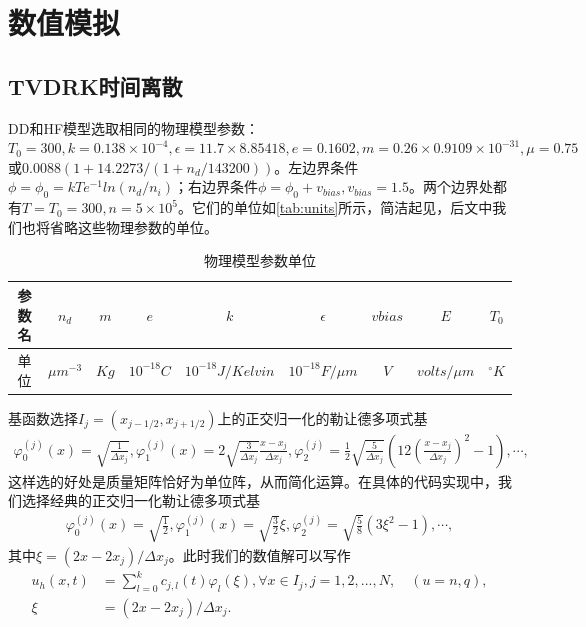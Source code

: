 \section{数值模拟}
\subsection{TVDRK时间离散}
DD和HF模型选取相同的物理模型参数：$T_0 = 300, k = 0.138 \times 10^{-4}, \epsilon = 11.7\times 8.85418, e = 0.1602, m = 0.26\times0.9109\times 10^{-31}, \mu = 0.75 $或$0.0088(1+14.2273/(1+n_d/143200))$。左边界条件$\phi=\phi_0=kTe^{-1}ln(n_d/n_i)$；右边界条件$\phi = \phi_0+v_{bias}, v_{bias}=1.5$。两个边界处都有$T=T_0 = 300, n = 5\times 10^5$。它们的单位如\autoref{tab:units}所示\cite{cercignani2000deviceb}，简洁起见，后文中我们也将省略这些物理参数的单位。
\begin{table}[htbp]
    \centering
    \begin{tabular}{ccccccccc}
        \hline
        参数名 & $n_d$        & $m$  & $e$         & $k$                & $\epsilon$        & $vbias$ & $E$           & $T_0$      \\
        \hline
        单位   & $\mu m^{-3}$ & $Kg$ & $10^{-18}C$ & $10^{-18}J/Kelvin$ & $10^{-18}F/\mu m$ & $V$     & $volts/\mu m$ & $^\circ K$ \\
        \hline
    \end{tabular}
    \caption{物理模型参数单位}
    \label{tab:units}
\end{table}

基函数选择$I_j = (x_{j-1/2}, x_{j+1/2})$上的正交归一化的勒让德多项式基
\begin{align*}
    \varphi_0^{(j)}(x) = \sqrt{\frac{1}{\Delta x_j}}, \varphi_1^{(j)}(x) = 2\sqrt{\frac{3}{\Delta x_j}}\frac{x-x_j}{\Delta x_j}, \varphi_2^{(j)} =\frac{1}{2}\sqrt{\frac{5}{\Delta x_j}}(12(\frac{x-x_j}{\Delta x_j})^2 - 1 ), \cdots,
\end{align*}
这样选的好处是质量矩阵恰好为单位阵，从而简化运算。在具体的代码实现中，我们选择经典的正交归一化勒让德多项式基
\begin{align*}
    \varphi_0^{(j)}(x) = \sqrt{\frac{1}{2}}, \varphi_1^{(j)}(x) = \sqrt{\frac{3}{2}}\xi, \varphi_2^{(j)} =\sqrt{\frac{5}{8}}(3\xi^2- 1 ), \cdots,
\end{align*}
其中$\xi = (2x-2x_j)/\Delta x_j$。此时我们的数值解可以写作
\begin{align*}
    u_h(x,t) & = \sum_{l=0}^k c_{j,l}(t)\varphi_{l}(\xi), \forall x \in I_j , j= 1,2,...,N, \quad (u = n,q), \\
    \xi      & = (2x-2x_j)/\Delta x_j.
\end{align*}

